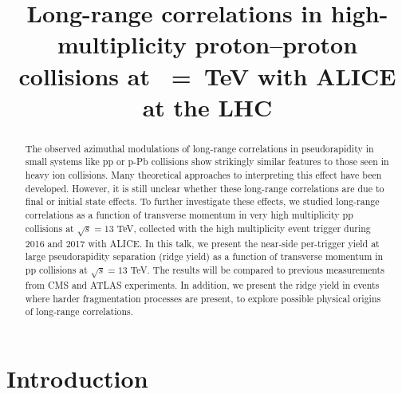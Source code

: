 \documentclass[ALICE,manyauthors]{cernphprep}
\begin{document}
%

\begin{titlepage}

\PHyear{}
\PHdate{\today}
%

\title{Long-range correlations  in high-multiplicity  proton--proton collisions  at \s~=~\unit[13]{TeV} with ALICE at the LHC}


\begin{abstract}

The observed azimuthal modulations of long-range correlations in pseudorapidity in small systems like pp or p-Pb collisions show strikingly similar features to those seen in heavy ion collisions. Many theoretical approaches to interpreting this effect have been developed. However, it is still unclear whether these long-range correlations are due to final or initial state effects. To further investigate these effects, we studied long-range correlations as a function of transverse momentum in very high multiplicity pp collisions at $\sqrt{s} =13$ TeV, collected with the high multiplicity event trigger during 2016 and 2017 with ALICE. In this talk, we present the near-side per-trigger yield at large pseudorapidity separation (ridge yield) as a function of transverse momentum in pp collisions at $\sqrt{s} =13$ TeV. The results will be compared to previous measurements from CMS and ATLAS experiments. In addition, we present the ridge yield in events where harder fragmentation processes are present, to explore possible physical origins of long-range correlations.

\end{abstract}
\end{titlepage}
\setcounter{page}{2}

\section{Introduction}
\end{document}
